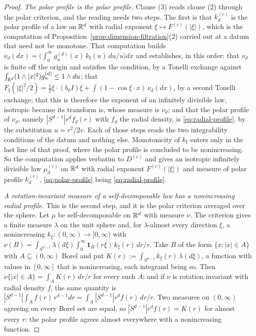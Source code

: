 \begin{proof}
\emph{The polar profile is the polar profile.} Clause (3) reads clause (2) through the polar
criterion, and the reading needs two steps. The first is that $k^{(c)}_d$ is the polar profile of
a law on $\mathbb{R}^d$ with radial exponent $\xi \mapsto F^{(c)}(|\xi|)$, which is the computation of
Proposition~\ref{prop:dimension-filtration}(2) carried out at a datum that need not be monotone.
That computation builds
$\nu_d(dx) = \bigl(\int_0^\infty g^{(d)}_u(x)\,k_{\mathrm I}(u)\,du/u\bigr)dx$ and establishes, in
this order: that $\nu_d$ is finite off the origin and satisfies the \Levy{} condition, by a
Tonelli exchange against $\int_{\mathbb{R}^d}(1 \wedge |x|^2)g^{(d)}_u \le 1 \wedge du$; that
$F_{\mathrm I}(|\xi|^2/2) = \tfrac12\xi\cdot(b_0I)\xi + \int(1 - \cos\xi\cdot x)\,\nu_d(dx)$, by a
second Tonelli exchange; that this is therefore the exponent of an infinitely divisible law,
isotropic because its transform is, whose \Levy{} measure is $\nu_d$; and that the polar profile
of $\nu_d$, namely $|S^{d-1}|r^df_d(r)$ with $f_d$ the radial density, is
\ref{eq:radial-profile}, by the substitution $u = r^2/2v$. Each of those steps reads the two
integrability conditions of the datum and nothing else. Monotonicity of $k_{\mathrm I}$ enters
only in the last line of that proof, where the polar profile is concluded to be nonincreasing. So
the computation applies verbatim to $D^{(c)}$ and gives an isotropic infinitely divisible law
$\mu^{(c)}_d$ on $\mathbb{R}^d$ with radial exponent $F^{(c)}(|\xi|)$ and \Levy{} measure of polar
profile $k^{(c)}_d$, \ref{eq:polar-profile} being \ref{eq:radial-profile}.

\emph{A rotation-invariant \Levy{} measure of a self-decomposable law has a nonincreasing radial
profile.} This is the second step, and it is the polar criterion averaged over the sphere. Let
$\mu$ be self-decomposable on $\mathbb{R}^d$ with \Levy{} measure $\nu$. The criterion gives a finite
measure $\lambda$ on the unit sphere and, for $\lambda$-almost every direction $\xi$, a
nonincreasing $k_\xi : (0,\infty) \to [0,\infty)$ with
$\nu(B) = \int_{S^{d-1}}\lambda(d\xi)\int_0^\infty \mathbf 1_B(r\xi)\,k_\xi(r)\,dr/r$. Take $B$ of
the form $\{x : |x| \in A\}$ with $A \subseteq (0,\infty)$ Borel and put
$K(r) := \int_{S^{d-1}}k_\xi(r)\,\lambda(d\xi)$, a function with values in $[0,\infty]$ that is
nonincreasing, each integrand being so. Then $\nu\{|x| \in A\} = \int_A K(r)\,dr/r$ for every such
$A$; and if $\nu$ is rotation invariant with radial density $f$, the same quantity is
$|S^{d-1}|\int_A f(r)\,r^{d-1}dr = \int_A|S^{d-1}|r^df(r)\,dr/r$. Two measures on $(0,\infty)$
agreeing on every Borel set are equal, so $|S^{d-1}|r^df(r) = K(r)$ for almost every $r$: the
polar profile agrees almost everywhere with a nonincreasing function.


\end{proof}
